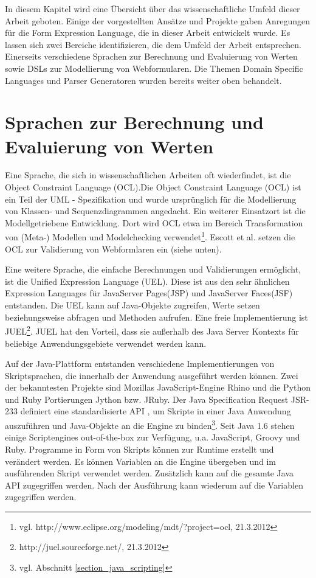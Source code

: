 In diesem Kapitel wird eine Übersicht über das wissenschaftliche Umfeld dieser Arbeit geboten. Einige der vorgestellten Ansätze und Projekte gaben Anregungen für die Form Expression Language, die in dieser Arbeit entwickelt wurde. Es lassen sich zwei Bereiche identifizieren, die dem Umfeld der Arbeit entsprechen. Einerseits verschiedene Sprachen zur Berechnung und Evaluierung von Werten sowie DSLs zur Modellierung von Webformularen. Die Themen Domain Specific Languages und Parser Generatoren wurden bereits weiter oben behandelt.

\section{Sprachen zur Berechnung und Evaluierung von Werten}

Eine Sprache, die sich in wissenschaftlichen Arbeiten oft wiederfindet, ist die Object Constraint Language (OCL)\cite{RiGo98}.Die Object Constraint Language (OCL) ist ein Teil der UML - Spezifikation und wurde ursprünglich für die Modellierung von Klassen- und Sequenzdiagrammen angedacht. Ein weiterer Einsatzort ist die Modellgetriebene Entwicklung. Dort wird OCL etwa im Bereich Transformation von (Meta-) Modellen und Modelchecking verwendet\footnote{vgl. http://www.eclipse.org/modeling/mdt/?project=ocl, 21.3.2012}. Escott et al.\cite{Esco12} setzen die OCL zur Validierung von Webformlaren ein (siehe unten).

Eine weitere Sprache, die einfache Berechnungen und Validierungen ermöglicht, ist die Unified Expression Language (UEL). Diese ist aus den sehr ähnlichen Expression Languages für JavaServer Pages(JSP) und JavaServer Faces(JSF) entstanden. Die UEL kann auf Java-Objekte zugreifen, Werte setzen beziehungsweise abfragen und Methoden aufrufen. Eine freie Implementierung ist JUEL\footnote{http://juel.sourceforge.net/, 21.3.2012}. JUEL hat den Vorteil, dass sie außerhalb des Java Server Kontexts für beliebige Anwendungsgebiete verwendet werden kann.

Auf der Java-Plattform entstanden verschiedene Implementierungen von Skriptsprachen, die innerhalb der Anwendung ausgeführt werden können. Zwei der bekanntesten Projekte sind Mozillas JavaScript-Engine Rhino\cite{wwwRhino} und die Python und Ruby Portierungen Jython bzw. JRuby. Der Java Specification Request JSR-233 definiert eine standardisierte API \cite{JSR-223}, um Skripte in einer Java Anwendung auszuführen und Java-Objekte an die Engine zu binden\footnote{vgl. Abschnitt \ref{section_java_scripting}}.  Seit Java 1.6 stehen einige Scriptengines out-of-the-box zur Verfügung, u.a. JavaScript, Groovy und Ruby. Programme in Form von Skripts können zur Runtime erstellt und verändert werden. Es können Variablen an die Engine übergeben und im ausführenden Skript verwendet werden. Zusätzlich kann auf die gesamte Java API zugegriffen werden. Nach der Ausführung kann wiederum auf die Variablen zugegriffen werden. 

